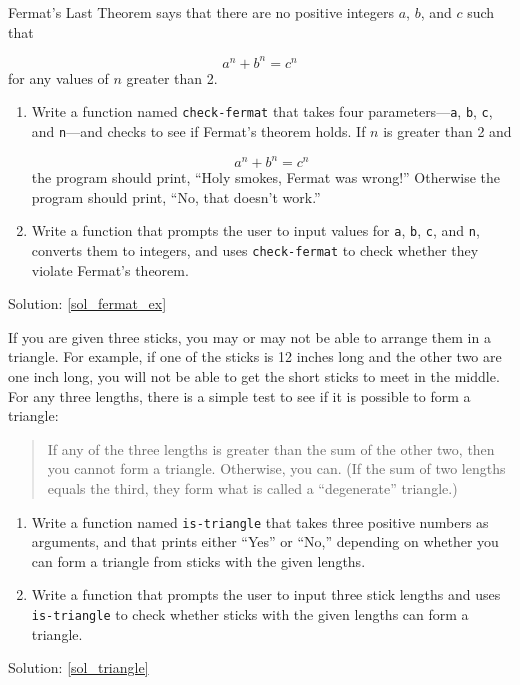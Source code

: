\begin{exercise}
\label{fermat_ex}

Fermat's Last Theorem says that there are no positive integers
$a$, $b$, and $c$ such that

\[ a^n + b^n = c^n \]
%
for any values of $n$ greater than 2.

\begin{enumerate}

\item Write a function named \verb"check-fermat" that takes four
parameters---{\tt a}, {\tt b}, {\tt c}, and {\tt n}---and
checks to see if Fermat's theorem holds.  If
$n$ is greater than 2 and 

\[a^n + b^n = c^n \]
%
the program should print, ``Holy smokes, Fermat was wrong!''
Otherwise the program should print, ``No, that doesn't work.''

\item Write a function that prompts the user to input values
for {\tt a}, {\tt b}, {\tt c}, and {\tt n}, converts them to
integers, and uses \verb"check-fermat" to check whether they
violate Fermat's theorem.
\end{enumerate}

Solution: \ref{sol_fermat_ex}


\end{exercise}


\begin{exercise}
\label{triangle}

If you are given three sticks, you may or may not be able to arrange
them in a triangle.  For example, if one of the sticks is 12 inches
long and the other two are one inch long, you will
not be able to get the short sticks to meet in the middle.  For any
three lengths, there is a simple test to see if it is possible 
to form a triangle:

\begin{quotation}
If any of the three lengths is greater than the sum of the other
  two, then you cannot form a triangle.  Otherwise, you
  can.  (If the sum of two lengths equals the third, they form
    what is called a ``degenerate'' triangle.)
\end{quotation}

\begin{enumerate}

\item Write a function named \verb"is-triangle" that takes three
positive numbers as arguments, and that prints either 
``Yes'' or ``No,'' depending on whether you can 
form a triangle from sticks with the given lengths.

\item Write a function that prompts the user to input 
three stick lengths and uses \verb"is-triangle" to check 
whether sticks with the given lengths can form a triangle.

\end{enumerate}

Solution: \ref{sol_triangle}


\end{exercise}

